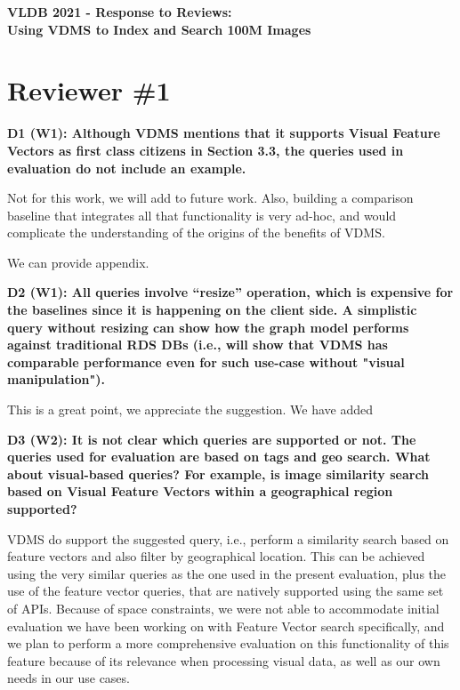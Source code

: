 \documentclass[11pt]{proposalnsf}
\begin{document}
\begin{center}
{\Large{\bf VLDB 2021 - Response to Reviews: \\
Using VDMS to Index and Search 100M Images}}

\end{center}

\section{Reviewer \#1}

\textbf{
D1 (W1): Although VDMS mentions that it supports Visual Feature Vectors as
first class citizens in Section 3.3, the queries used in evaluation
do not include an example.
}\bigskip


Not for this work, we will add to future work.
Also, building a comparison baseline that integrates all that functionality
is very ad-hoc, and would complicate the understanding of the origins
of the benefits of VDMS.

We can provide appendix.

\bigskip
\textbf{
D2 (W1): All queries involve “resize” operation, which is expensive for the
baselines since it is happening on the client side.
A simplistic query without resizing can show how the graph model performs
against traditional RDS DBs (i.e., will show that VDMS has comparable
performance even for such use-case without "visual manipulation").
}\bigskip

This is a great point, we appreciate the suggestion.
We have added

\bigskip
\textbf{
D3 (W2): It is not clear which queries are supported or not.
The queries used for evaluation are based on tags and geo search.
What about visual-based queries? For example, is image similarity search based
on Visual Feature Vectors within a geographical region supported?
}\bigskip

VDMS do support the suggested query, i.e., perform a similarity search based
on feature vectors and also filter by geographical location.
This can be achieved using the very similar queries as the one used in
the present evaluation, plus the use of the feature vector queries,
that are natively supported using the same set of APIs.
Because of space constraints, we were not able to accommodate initial evaluation
we have been working on with Feature Vector search specifically,
and we plan to perform a more comprehensive evaluation on this functionality
of this feature because of its relevance when processing visual data, as well
as our own needs in our use cases.
\end{document}
